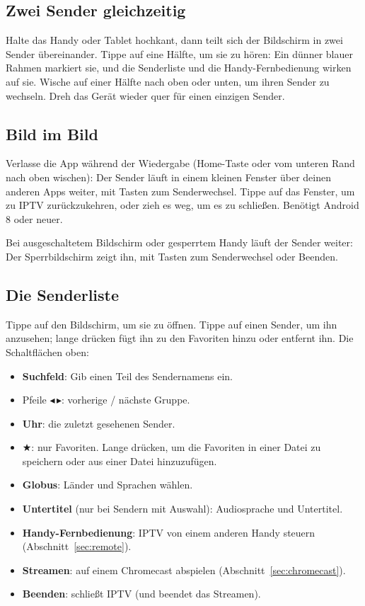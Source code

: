 \subsection{Zwei Sender gleichzeitig}
Halte das Handy oder Tablet hochkant, dann teilt sich der Bildschirm in zwei
Sender übereinander. Tippe auf eine Hälfte, um sie zu hören: Ein dünner blauer
Rahmen markiert sie, und die Senderliste und die Handy-Fernbedienung wirken
auf sie. Wische auf einer Hälfte nach oben oder unten, um ihren Sender zu
wechseln. Dreh das Gerät wieder quer für einen einzigen Sender.

\subsection{Bild im Bild}
Verlasse die App während der Wiedergabe (Home-Taste oder vom unteren Rand
nach oben wischen): Der Sender läuft in einem kleinen Fenster über deinen
anderen Apps weiter, mit Tasten zum Senderwechsel. Tippe auf das Fenster, um
zu IPTV zurückzukehren, oder zieh es weg, um es zu schließen. Benötigt
Android 8 oder neuer.

Bei ausgeschaltetem Bildschirm oder gesperrtem Handy läuft der Sender weiter:
Der Sperrbildschirm zeigt ihn, mit Tasten zum Senderwechsel oder Beenden.

\subsection{Die Senderliste}
Tippe auf den Bildschirm, um sie zu öffnen. Tippe auf einen Sender, um ihn
anzusehen; lange drücken fügt ihn zu den Favoriten hinzu oder entfernt ihn.
Die Schaltflächen oben:
\begin{itemize}
  \item \textbf{Suchfeld}: Gib einen Teil des Sendernamens ein.
  \item Pfeile $\blacktriangleleft$\,$\blacktriangleright$: vorherige /
        nächste Gruppe.
  \item \textbf{Uhr}: die zuletzt gesehenen Sender.
  \item $\bigstar$: nur Favoriten. Lange drücken, um die Favoriten in einer
        Datei zu speichern oder aus einer Datei hinzuzufügen.
  \item \textbf{Globus}: Länder und Sprachen wählen.
  \item \textbf{Untertitel} (nur bei Sendern mit Auswahl): Audiosprache und
        Untertitel.
  \item \textbf{Handy-Fernbedienung}: IPTV von einem anderen Handy steuern
        (Abschnitt~\ref{sec:remote}).
  \item \textbf{Streamen}: auf einem Chromecast abspielen
        (Abschnitt~\ref{sec:chromecast}).
  \item \textbf{Beenden}: schließt IPTV (und beendet das Streamen).
\end{itemize}

